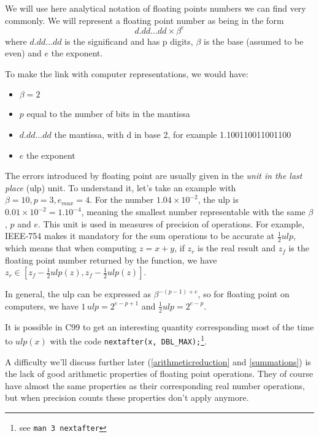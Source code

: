 
We will use here analytical notation of floating points numbers we can find very commonly. We will represent a floating point number as being in the form $$d.dd...dd\times\beta^e$$where $d.dd...dd$ is the significand and has p digits, $\beta$ is the base (assumed to be even) and $e$ the exponent.

To make the link with computer representations, we would have:
\begin{itemize}
\item $\beta=2$
\item $p$ equal to the number of bits in the mantissa
\item $d.dd...dd$ the mantissa, with d in base 2, for example 1.100110011001100
\item $e$ the exponent
\end{itemize}

\label{ulp}

The errors introduced by floating point are usually given in the \emph{unit in the last place} (ulp) unit. To understand it, let's take an example with $\beta=10, p=3, e_{max}=4$. For the number $1.04\times 10^{-2}$, the ulp is $0.01\times 10^{-2} = 1.10^{-4}$, meaning the smallest number representable with the same $\beta$, $p$ and $e$. This unit is used in measures of precision of operations. For example, IEEE-754 makes it mandatory for the sum operations to be accurate at $\frac{1}{2}ulp$, which means that when computing $z=x+y$, if $z_r$ is the real result and $z_f$ is the floating point number returned by the function, we have $z_r\in[z_f-\frac{1}{2}ulp(z), z_f-\frac{1}{2}ulp(z)]$.

In general, the ulp can be expressed as $\beta^{-(p-1)+e}$, so for floating point on computers, we have $1\,ulp=2^{e-p+1}$ and $\frac{1}{2}ulp=2^{e-p}$.


It is possible in C99 to get an interesting quantity corresponding most of the time to $ulp(x)$ with the code \texttt{nextafter(x, DBL\_MAX);}\footnote{see \texttt{man 3 nextafter}}.


A difficulty we'll discuss further later (\ref{arithmeticreduction} and \ref{summations}) is the lack of good arithmetic properties of floating point operations. They of course have almost the same properties as their corresponding real number operations, but when precision counts these properties don't apply anymore.

